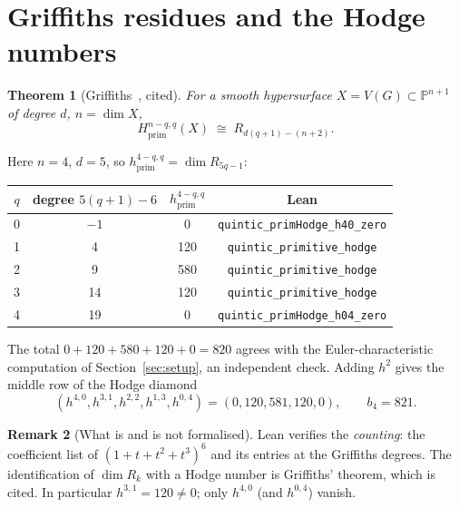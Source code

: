 \documentclass[11pt]{article}
\newtheorem{theorem}{Theorem}[section]\newtheorem{proposition}[theorem]{Proposition}
\theoremstyle{definition}\newtheorem{definition}[theorem]{Definition}\newtheorem{remark}[theorem]{Remark}
\newcommand{\PP}{\mathbb{P}}\newcommand{\CC}{\mathbb{C}}\newcommand{\QQ}{\mathbb{Q}}
\begin{document}
\section{Griffiths residues and the Hodge numbers}\label{sec:hodge}
\begin{theorem}[Griffiths~\cite{Griffiths69}, cited]
For a smooth hypersurface $X=V(G)\subset\PP^{n+1}$ of degree $d$, $n=\dim X$,
\[ H^{n-q,q}_{\mathrm{prim}}(X)\;\cong\;R_{d(q+1)-(n+2)}. \]
\end{theorem}
Here $n=4$, $d=5$, so $h^{4-q,q}_{\mathrm{prim}}=\dim R_{5q-1}$:
\begin{center}\begin{tabular}{cccc}\toprule
$q$ & degree $5(q+1)-6$ & $h^{4-q,q}_{\mathrm{prim}}$ & Lean\\\midrule
0 & $-1$ & 0 & \texttt{quintic\_primHodge\_h40\_zero}\\
1 & 4 & 120 & \texttt{quintic\_primitive\_hodge}\\
2 & 9 & 580 & \texttt{quintic\_primitive\_hodge}\\
3 & 14 & 120 & \texttt{quintic\_primitive\_hodge}\\
4 & 19 & 0 & \texttt{quintic\_primHodge\_h04\_zero}\\\bottomrule
\end{tabular}\end{center}
The total $0+120+580+120+0=820$ agrees with the Euler-characteristic computation of
Section~\ref{sec:setup}, an independent check. Adding $h^2$ gives the middle row of the Hodge diamond
\[ (h^{4,0},h^{3,1},h^{2,2},h^{1,3},h^{0,4})=(0,120,581,120,0),\qquad b_4=821. \]
\begin{remark}[What is and is not formalised]
Lean verifies the \emph{counting}: the coefficient list of $(1+t+t^2+t^3)^6$ and its entries at the
Griffiths degrees. The identification of $\dim R_k$ with a Hodge number is Griffiths' theorem, which is
cited. In particular $h^{3,1}=120\neq0$; only $h^{4,0}$ (and $h^{0,4}$) vanish.
\end{remark}
\end{document}
